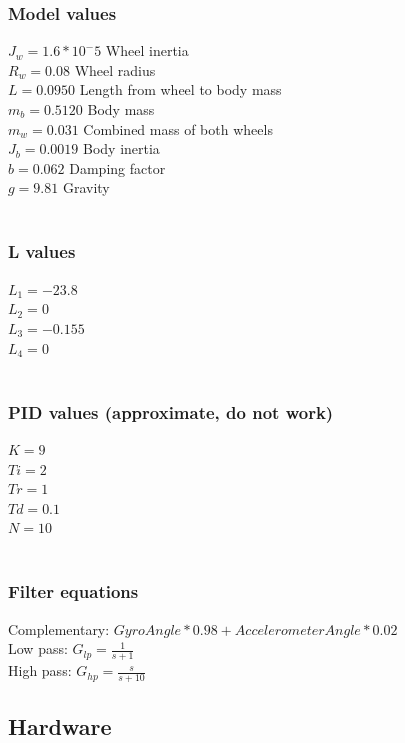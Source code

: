 \documentclass[a4paper]{article}
\begin{document}
\subsubsection*{Model values}
$J_w = 1.6*10^-5$ Wheel inertia \\
$R_w = 0.08$ Wheel radius \\
$L = 0.0950$ Length from wheel to body mass \\
$m_b = 0.5120$ Body mass \\
$m_w = 0.031$ Combined mass of both wheels \\
$J_b = 0.0019$ Body inertia \\
$b = 0.062$ Damping factor \\
$g = 9.81$ Gravity \\ \\

\subsubsection*{L values}
$L_1=-23.8$\\
$L_2=0$\\
$L_3=-0.155$\\
$L_4=0$\\ \\

\subsubsection*{PID values (approximate, do not work)}
$K=9$\\
$Ti=2$\\
$Tr=1$\\
$Td=0.1$\\
$N=10$\\ \\

\subsubsection*{Filter equations}
Complementary: $GyroAngle * 0.98 + AccelerometerAngle*0.02$ \\
Low pass: $G_{lp} = \frac{1}{s+1}$\\
High pass: $G_{hp} = \frac{s}{s+10}$\\

\subsection{Hardware}
\end{document}
